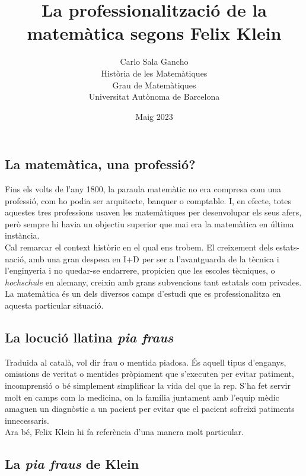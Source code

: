 \documentclass[a4paper, 11pt]{article}
\title{La professionalització de la matemàtica segons Felix Klein}
\author{
  Carlo Sala Gancho\\
  Història de les Matemàtiques\\
  Grau de Matemàtiques\\
  Universitat Autònoma de Barcelona}
\date{Maig 2023}
\begin{document}
\maketitle

\subsection*{La matemàtica, una professió?}
  Fins els volts de l'any 1800, la paraula matemàtic no era compresa com una professió, com ho podia ser arquitecte,
  banquer o comptable. I, en efecte, totes aquestes tres professions usaven les matemàtiques per desenvolupar els seus
  afers, però sempre hi havia un objectiu superior que mai era la matemàtica en última instància.\\
  Cal remarcar el context històric en el qual ens trobem. El creixement dels estats-nació, amb una gran despesa en I+D
  per ser a l'avantguarda de la tècnica i l'enginyeria i no quedar-se endarrere, propicien que les escoles tècniques, o
  \textit{hochschule} en alemany, creixin amb grans subvencions tant estatals com privades. La matemàtica és un dels
  diversos camps d'estudi que es professionalitza en aquesta particular situació.

\subsection*{La locució llatina \textit{pia fraus}}

  Traduida al català, vol dir frau o mentida piadosa. És aquell tipus d'enganys, omissions de veritat o mentides
  pròpiament que s'executen per evitar patiment, incomprensió o bé simplement simplificar la vida del que la rep. S'ha
  fet servir molt en camps com la medicina, on la família juntament amb l'equip mèdic amaguen un diagnòstic a un pacient
  per evitar que el pacient sofreixi patiments innecessaris.\\
  Ara bé, Felix Klein hi fa referència d'una manera molt particular.

\subsection*{La \textit{pia fraus} de Klein}
\end{document}
